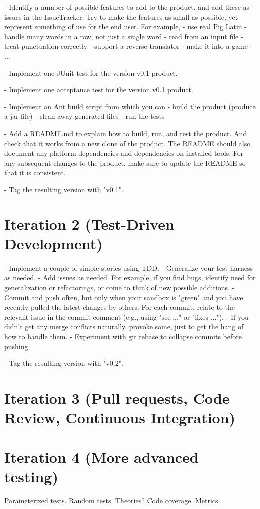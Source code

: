 \documentclass[swedish,english]{article}
\begin{document}
- Identify a number of possible features to add to the product, and add these as issues in the IssueTracker. Try to make the features as small as possible, yet represent something of use for the end user. For example,
  - use real Pig Latin
  - handle many words in a row, not just a single word
  - read from an input file
  - treat punctuation correctly
  - support a reverse translator
  - make it into a game
  - ...

- Implement one JUnit test for the version v0.1 product.

- Implement one acceptance test for the version v0.1 product.

- Implement an Ant build script from which you can
  - build the product (produce a jar file)
  - clean away generated files
  - run the tests

- Add a README.md to explain how to build, run, and test the product. And check that it works from a new clone of the product. The README should also document any platform dependencies and dependencies on installed tools. For any subsequent changes to the product, make sure to update the README so that it is consistent.

- Tag the resulting version with "v0.1".

\section*{Iteration 2 (Test-Driven Development)}

- Implement a couple of simple stories using TDD. 
- Generalize your test harness as needed.
- Add issues as needed. For example, if you find bugs, identify need for generalization or refactorings, or come to think of new possible additions.
- Commit and push often, but only when your sandbox is "green" and you have recently pulled the latest changes by others. For each commit, relate to the relevant issue in the commit comment (e.g., using "see ..." or "fixes ...").
- If you didn't get any merge conflicts naturally, provoke some, just to get the hang of how to handle them.
- Experiment with git rebase to collapse commits before pushing.

- Tag the resulting version with "v0.2".

\section*{Iteration 3 (Pull requests, Code Review, Continuous Integration)}



\section*{Iteration 4 (More advanced testing)}

Parameterized tests.
Random tests.
Theories?
Code coverage.
Metrics.
\end{document}
